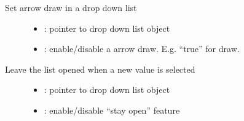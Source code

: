 \documentclass[letterpaper,10pt,english]{sphinxmanual}
\begin{document}

\begin{fulllineitems}
\label{\detokenize{object-types/ddlist:_CPPv424lv_ddlist_set_draw_arrowP8lv_obj_tb}}%
\pysigstartmultiline
{}\label{\detokenize{object-types/ddlist:lv__ddlist_8h_1aa06529c8203c29d560f411d3fa70d36c}}%
\pysigstopmultiline
Set arrow draw in a drop down list \begin{description}
\item[{}] \leavevmode\begin{itemize}
\item {} 
: pointer to drop down list object 

\item {} 
: enable/disable a arrow draw. E.g. “true” for draw. 

\end{itemize}

\end{description}


\end{fulllineitems}


\begin{fulllineitems}
\label{\detokenize{object-types/ddlist:_CPPv423lv_ddlist_set_stay_openP8lv_obj_tb}}%
\pysigstartmultiline
{}\label{\detokenize{object-types/ddlist:lv__ddlist_8h_1ad615f6fab2d9401550d6bfe9626b2faa}}%
\pysigstopmultiline
Leave the list opened when a new value is selected \begin{description}
\item[{}] \leavevmode\begin{itemize}
\item {} 
: pointer to drop down list object 

\item {} 
: enable/disable “stay open” feature 

\end{itemize}

\end{description}


\end{fulllineitems}
\end{document}
